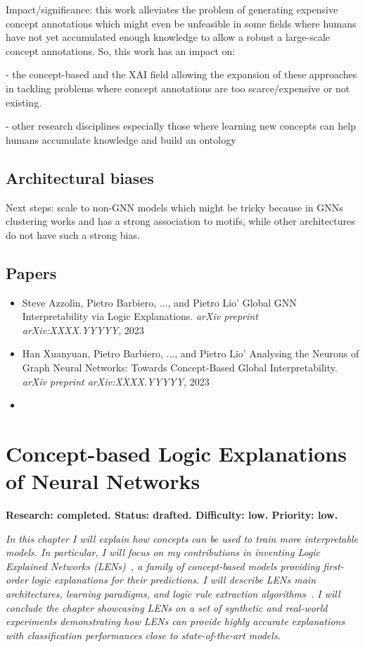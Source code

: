 \documentclass[withindex,glossary]{cam-thesis}
\theoremstyle{plain}
\theoremstyle{definition}
\theoremstyle{remark}
\begin{document}
Impact/significance: this work alleviates the problem of generating expensive concept annotations which might even be unfeasible in some fields where humans have not yet accumulated enough knowledge to allow a robust a large-scale concept annotations. So, this work has an impact on:

- the concept-based and the XAI field allowing the expansion of these approaches in tackling problems where concept annotations are too scarce/expensive or not existing.

- other research disciplines especially those where learning new concepts can help humans accumulate knowledge and build an ontology

\section{Architectural biases}
Next steps: scale to non-GNN models which might be tricky because in GNNs clustering works and has a strong association to motifs, while other architectures do not have such a strong bias.

\section*{Papers}
\nobibliography*
\begin{itemize}
    \item Steve Azzolin, Pietro Barbiero, ..., and Pietro Lio' Global GNN Interpretability via Logic Explanations. \textit{arXiv preprint arXiv:XXXX.YYYYY}, 2023
    \item Han Xuanyuan, Pietro Barbiero, ..., and Pietro Lio' Analysing the Neurons of Graph Neural Networks: Towards Concept-Based Global Interpretability. \textit{arXiv preprint arXiv:XXXX.YYYYY}, 2023
    \item {}
\end{itemize}


\chapter{Concept-based Logic Explanations of Neural Networks} \label{chapter:lens}
\textbf{Research: completed. Status: drafted. Difficulty: low. Priority: low.}

\textit{In this chapter I will explain how concepts can be used to train more interpretable models. In particular, I will focus on my contributions in inventing Logic Explained Networks (LENs)~\citep{ciravegna2021logic}, a family of concept-based models providing first-order logic explanations for their predictions. I will describe LENs main architectures, learning paradigms, and logic rule extraction algorithms~\citep{barbiero2021entropy}. I will conclude the chapter showcasing LENs on a set of synthetic and real-world experiments demonstrating how LENs can provide highly accurate explanations with classification performances close to state-of-the-art models.}
\end{document}
